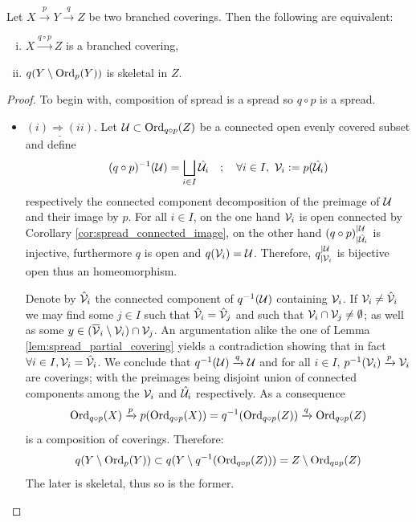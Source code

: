 \begin{prop} \label{prop:branched_covering_composition}Let $X\xrightarrow{p} Y \xrightarrow{q} Z $ be two branched coverings.   Then the following are equivalent: 
\begin{enumerate}[(i)]
 \item $X\xrightarrow{q\circ p} Z$ is a branched covering,
     \item $q(Y\setminus \mathrm{Ord}_p(Y))$  is skeletal in $Z$.
 \end{enumerate}


\end{prop}
\begin{proof}
To begin with, composition of spread is a spread so $q\circ p$ is a spread. 
 
 \begin{itemize}
 \item $\underline{(i)\Rightarrow (ii)}$.  Let $\mathcal{U}\subset \mathrm{Ord}_{q\circ p}(Z)$ be a connected open  evenly covered subset and define 
 $$ (q\circ p)^{-1}(\mathcal{U}) = \bigsqcup_{i\in I} \hat {\mathcal{U}}_i   \quad ; \quad \forall i\in I,~\mathcal V_i := p(\hat {\mathcal{U}}_i) $$
respectively the connected component decomposition of the preimage of $\mathcal{U}$ and their image by $p$. 
For all $i\in I$, on the one hand $\mathcal V_i$ is open connected by Corollary 
\ref{cor:spread_connected_image}, on the other hand 
$(q\circ p)_{|\hat {\mathcal{U}}_i}^{|\mathcal{U}}$ is injective, furthermore $q$ is open and $q(\mathcal V_i) = \mathcal{U}$.
Therefore, $q_{|\mathcal V_i}^{|\mathcal{U}}$ is bijective open thus an homeomorphism.

Denote by $\hat {\mathcal V}_i$ the connected component of $q^{-1}(\mathcal{U})$ containing $\mathcal V_i$. 
If $\mathcal V_i\neq \hat {\mathcal V}_i$ we may find some $j\in I$ such that $\hat {\mathcal V}_i = \hat{\mathcal V}_j$ 
and such that $\mathcal V_i\cap \mathcal V_j \neq \emptyset$; as well as some 
$y\in (\overline {\mathcal V}_i\setminus \mathcal V_i) \cap \mathcal V_j$. 
An argumentation alike the one of Lemma \ref{lem:spread_partial_covering}
yields a contradiction showing that in fact $\forall i\in I, \mathcal V_i = \hat {\mathcal V}_i$.  
We conclude that $q^{-1}(\mathcal{U})\xrightarrow{q} \mathcal{U}$ and 
for all $i\in I$, $p^{-1}(\mathcal V_i)\xrightarrow{p} \mathcal V_i$ are coverings; 
with the preimages being disjoint union of connected components 
among the $\mathcal V_i$ and $\hat{\mathcal{U}}_i$ respectively. 
As a consequence 
$$\mathrm{Ord}_{q\circ p}(X)\xrightarrow{p} p(\mathrm{Ord}_{q\circ p}(X))=q^{-1}(\mathrm{Ord}_{q\circ p}(Z)) \xrightarrow{q} \mathrm{Ord}_{q\circ p}(Z)$$
is a composition of coverings.
Therefore: 
$$q(Y\setminus \mathrm{Ord}_p(Y)) \subset q(Y\setminus q^{-1}(\mathrm{Ord}_{q\circ p}(Z))) 
= Z\setminus \mathrm{Ord}_{q\circ p}(Z)$$
The later is skeletal, thus so is the former.





\end{itemize}
\end{proof}
